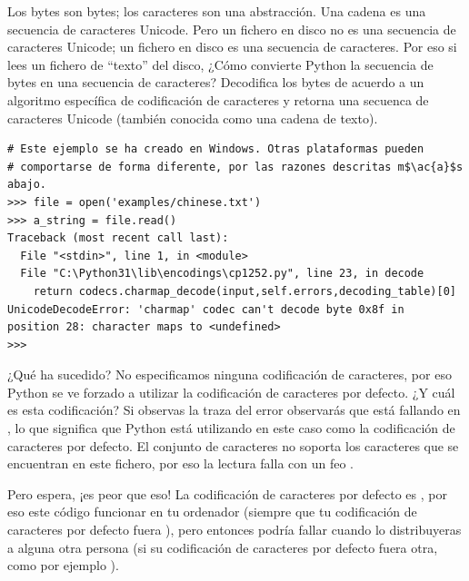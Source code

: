 Los bytes son bytes; los caracteres son una abstracción. Una cadena es una secuencia de caracteres Unicode. Pero un fichero en disco no es una secuencia de caracteres Unicode; un fichero en disco es una secuencia de caracteres. Por eso si lees un fichero de ``texto'' del disco, ¿Cómo convierte Python la secuencia de bytes en una secuencia de caracteres? Decodifica los bytes de acuerdo a un algoritmo específica de codificación de caracteres y retorna una secuenca de caracteres Unicode (también conocida como una cadena de texto).

\noindent\begin{minipage}{\textwidth}
\begin{lstlisting}[mathescape=True]
# Este ejemplo se ha creado en Windows. Otras plataformas pueden 
# comportarse de forma diferente, por las razones descritas m$\ac{a}$s abajo.
>>> file = open('examples/chinese.txt')
>>> a_string = file.read()
Traceback (most recent call last):
  File "<stdin>", line 1, in <module>
  File "C:\Python31\lib\encodings\cp1252.py", line 23, in decode
    return codecs.charmap_decode(input,self.errors,decoding_table)[0]
UnicodeDecodeError: 'charmap' codec can't decode byte 0x8f in 
position 28: character maps to <undefined>
>>> 
\end{lstlisting}
\end{minipage}

¿Qué ha sucedido? No especificamos ninguna codificación de caracteres, por eso Python se ve forzado a utilizar la codificación de caracteres por defecto. ¿Y cuál es esta codificación? Si observas la traza del error observarás que está fallando en , lo que significa que Python está utilizando en este caso  como la codificación de caracteres por defecto. El conjunto de caracteres  no soporta los caracteres que se encuentran en este fichero, por eso la lectura falla con un feo .


Pero espera, ¡es peor que eso! La codificación de caracteres por defecto es , por eso este código  funcionar en tu ordenador (siempre que tu codificación de caracteres por defecto fuera ), pero entonces podría fallar cuando lo distribuyeras a alguna otra persona (si su codificación de caracteres por defecto fuera otra, como por ejemplo ).

